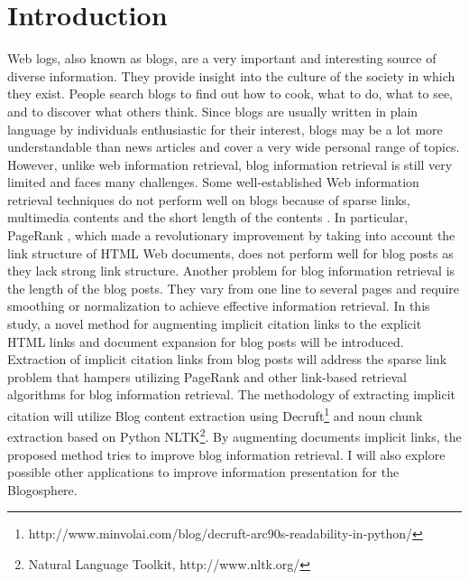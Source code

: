 \documentclass{sig-alternate}
\begin{document}



\section{Introduction}

Web logs, also known as blogs, are a very important and interesting source of diverse information. They provide insight into the culture of the society in which they exist. People search blogs to find out how to cook, what to do, what to see, and to discover what others think. Since blogs are usually written in plain language by individuals enthusiastic for their interest, blogs may be a lot more understandable than news articles and cover a very wide personal range of topics. However, unlike web information retrieval, blog information retrieval is still very limited and faces many challenges. Some well-established Web information retrieval techniques do not perform well on blogs because of sparse links, multimedia contents and the short length of the contents \cite{Agarwal}. In particular, PageRank \cite{Brin1998a}, which made a revolutionary improvement by taking into account the link structure of HTML Web documents, does not perform well for blog posts as they lack strong link structure. Another problem for blog information retrieval is the length of the blog posts. They vary from one line to several pages and require smoothing or normalization to achieve effective information retrieval. 
	In this study, a novel method for augmenting implicit citation links to the explicit HTML links and document expansion for blog posts will be introduced. Extraction of implicit citation links from blog posts will address the sparse link problem that hampers utilizing PageRank and other link-based retrieval algorithms for blog information retrieval. The methodology of extracting implicit citation will utilize Blog content extraction using Decruft\footnote{http://www.minvolai.com/blog/decruft-arc90s-readability-in-python/} and noun chunk extraction based on Python NLTK\footnote{Natural Language Toolkit, http://www.nltk.org/}. By augmenting documents implicit links, the proposed method tries to improve blog information retrieval. I will also explore possible other applications to improve information presentation for the Blogosphere.
\end{document}
